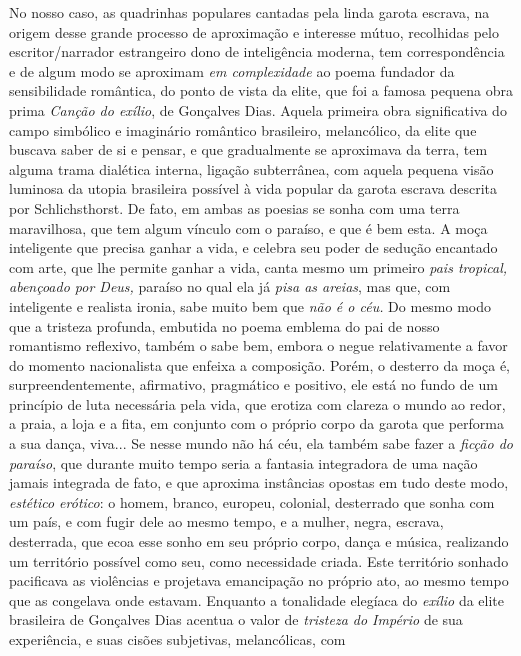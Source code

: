 No nosso caso, as quadrinhas populares cantadas pela linda garota
escrava, na origem desse grande processo de aproximação e interesse
mútuo, recolhidas pelo escritor/narrador estrangeiro dono de
inteligência moderna, tem correspondência e de algum modo se aproximam
\emph{em complexidade} ao poema fundador da sensibilidade romântica, do
ponto de vista da elite, que foi a famosa pequena obra prima
\emph{Canção do exílio}, de Gonçalves Dias. Aquela primeira obra
significativa do campo simbólico e imaginário romântico brasileiro,
melancólico, da elite que buscava saber de si e pensar, e que
gradualmente se aproximava da terra, tem alguma trama dialética interna,
ligação subterrânea, com aquela pequena visão luminosa da utopia
brasileira possível à vida popular da garota escrava descrita por
Schlichsthorst. De fato, em ambas as poesias se sonha com uma terra
maravilhosa, que tem algum vínculo com o paraíso, e que é bem esta. A
moça inteligente que precisa ganhar a vida, e celebra seu poder de
sedução encantado com arte, que lhe permite ganhar a vida, canta mesmo
um primeiro \emph{pais tropical, abençoado por Deus,} paraíso no qual
ela já \emph{pisa as areias}, mas que, com inteligente e realista
ironia, sabe muito bem que \emph{não é o céu.} Do mesmo modo que a
tristeza profunda, embutida no poema emblema do pai de nosso romantismo
reflexivo, também o sabe bem, embora o negue relativamente a favor do
momento nacionalista que enfeixa a composição. Porém, o desterro da moça
é, surpreendentemente, afirmativo, pragmático e positivo, ele está no
fundo de um princípio de luta necessária pela vida, que erotiza com
clareza o mundo ao redor, a praia, a loja e a fita, em conjunto com o
próprio corpo da garota que performa a sua dança, viva... Se nesse mundo
não há céu, ela também sabe fazer a \emph{ficção do paraíso}, que
durante muito tempo seria a fantasia integradora de uma nação jamais
integrada de fato, e que aproxima instâncias opostas em tudo deste modo,
\emph{estético erótico}: o homem, branco, europeu, colonial, desterrado
que sonha com um país, e com fugir dele ao mesmo tempo, e a mulher,
negra, escrava, desterrada, que ecoa esse sonho em seu próprio corpo,
dança e música, realizando um território possível como seu, como
necessidade criada. Este território sonhado pacificava as violências e
projetava emancipação no próprio ato, ao mesmo tempo que as congelava
onde estavam. Enquanto a tonalidade elegíaca do \emph{exílio} da elite
brasileira de Gonçalves Dias acentua o valor de \emph{tristeza do
Império} de sua experiência, e suas cisões subjetivas, melancólicas, com
